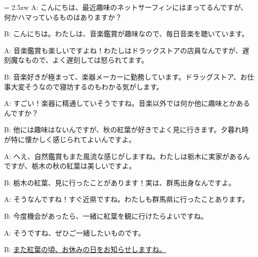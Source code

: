 \documentclass[11pt]{amsart}
\title{}
\author{}
\newenvironment{hangall}[1]{\hangindent = 2.5zw\everypar{\hangindent = 2.5zw}}{}
\begin{document}
\maketitle
\begin{hangall}{}%
A: こんにちは、最近趣味のネットサーフィンにはまってるんですが、何かハマっているものはありますか？

B: こんにちは。わたしは、音楽鑑賞が趣味なので、毎日音楽を聴いています。

A: 音楽鑑賞も楽しいですよね！わたしはドラックストアの店員なんですが、遅刻魔なもので、よく遅刻しては怒られてます。

B: 音楽好きが極まって、楽器メーカーに勤務しています。ドラッグストア、お仕事大変そうなので寝坊するのもわかる気がします。

A: すごい！楽器に精通していそうですね。音楽以外では何か他に趣味とかあるんですか？

B: 他には趣味はないんですが、秋の紅葉が好きでよく見に行きます。夕暮れ時が特に懐かしく感じられてよいんですよ。

A: へえ、自然鑑賞もまた風流な感じがしますね。わたしは栃木に実家があるんですが、栃木の秋の紅葉は美しいですよ。

B: 栃木の紅葉、見に行ったことがあります！実は、群馬出身なんですよ。

A: そうなんですね！すぐ近県ですね。わたしも群馬県に行ったことあります。

B: 今度機会があったら、一緒に紅葉を観に行けたらよいですね。

A: そうですね、ぜひご一緒したいものです。

B: \ul{また紅葉の頃、お休みの日をお知らせしますね。}\end{hangall}
\end{document}
